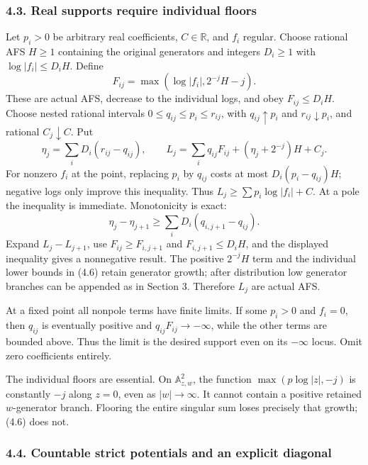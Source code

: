 \documentclass[
  10pt,
]{article}
\begin{document}
\subsubsection{4.3. Real supports require individual
floors}\label{real-supports-require-individual-floors}

Let \(p_i>0\) be arbitrary real coefficients, \(C\in\mathbb R\), and
\(f_i\) regular. Choose rational AFS \(H\ge1\) containing the original
generators and integers \(D_i\ge1\) with \(\log|f_i|\le D_iH\). Define
\[F_{ij}=\max(\log|f_i|,2^{-j}H-j). \tag{4.6}\] These are actual AFS,
decrease to the individual logs, and obey \(F_{ij}\le D_iH\). Choose
nested rational intervals \(0\le q_{ij}\le p_i\le r_{ij}\), with
\(q_{ij}\uparrow p_i\) and \(r_{ij}\downarrow p_i\), and rational
\(C_j\downarrow C\). Put \[\eta_j=\sum_iD_i(r_{ij}-q_{ij}),\qquad
 L_j=\sum_iq_{ij}F_{ij}+(\eta_j+2^{-j})H+C_j. \tag{4.7}\] For nonzero
\(f_i\) at the point, replacing \(p_i\) by \(q_{ij}\) costs at most
\(D_i(p_i-q_{ij})H\); negative logs only improve this inequality. Thus
\(L_j\ge\sum p_i\log|f_i|+C\). At a pole the inequality is immediate.
Monotonicity is exact:
\[\eta_j-\eta_{j+1}\ge\sum_iD_i(q_{i,j+1}-q_{ij}).\] Expand
\(L_j-L_{j+1}\), use \(F_{ij}\ge F_{i,j+1}\) and \(F_{i,j+1}\le D_iH\),
and the displayed inequality gives a nonnegative result. The positive
\(2^{-j}H\) term and the individual lower bounds in (4.6) retain
generator growth; after distribution low generator branches can be
appended as in Section 3. Therefore \(L_j\) are actual AFS.

At a fixed point all nonpole terms have finite limits. If some \(p_i>0\)
and \(f_i=0\), then \(q_{ij}\) is eventually positive and
\(q_{ij}F_{ij}\to-\infty\), while the other terms are bounded above.
Thus the limit is the desired support even on its \(-\infty\) locus.
Omit zero coefficients entirely.

The individual floors are essential. On \(\mathbb A^2_{z,w}\), the
function \(\max(p\log|z|,-j)\) is constantly \(-j\) along \(z=0\), even
as \(|w|\to\infty\). It cannot contain a positive retained
\(w\)-generator branch. Flooring the entire singular sum loses precisely
that growth; (4.6) does not.

\subsubsection{4.4. Countable strict potentials and an explicit
diagonal}\label{countable-strict-potentials-and-an-explicit-diagonal}
\end{document}

